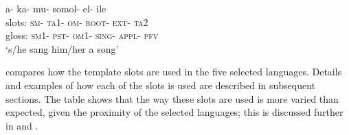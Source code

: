 \documentclass[output=paper,
            colorlinks, citecolor=brown
            ,draftmode
		  ]{langscibook}
\begin{document}
\ea {}  a-    ka-    mu-  somol-  el-    ile\\
{slots:} \textsc{sm-}  \textsc{ta1}{{}-} \textsc{om-}  \textsc{root-}    \textsc{ext-}  \textsc{ta2}\\
{gloss:} \textsc{sm}{1-} \textsc{pst}{{}-} \textsc{om}{1-}  \textsc{sing-} \textsc{appl}{{}-} \textsc{pfv}\\
\glt          {}`s/he sang him/her a song'
\z



 compares how the template slots are used in the five selected languages. Details and examples of how each of the slots is used are described in subsequent sections. The table shows that the way these slots are used is more varied than expected, given the proximity of the selected languages; this is discussed further in  and .
\end{document}
